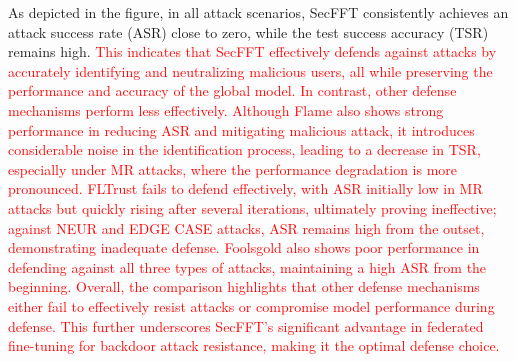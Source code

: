 \documentclass[lettersize,journal]{IEEEtran}
\begin{document}
As depicted in the figure, in all attack scenarios, SecFFT consistently achieves an attack success rate (ASR) close to zero, while the test success accuracy (TSR) remains high. \textcolor{red}{This indicates that SecFFT effectively defends against attacks by accurately identifying and neutralizing malicious users, all while preserving the performance and accuracy of the global model. In contrast, other defense mechanisms perform less effectively. Although Flame also shows strong performance in reducing ASR and mitigating malicious attack, it introduces considerable noise in the identification process, leading to a decrease in TSR, especially under MR attacks, where the performance degradation is more pronounced. FLTrust fails to defend effectively, with ASR initially low in MR attacks but quickly rising after several iterations, ultimately proving ineffective; against NEUR and EDGE CASE attacks, ASR remains high from the outset, demonstrating inadequate defense. Foolsgold also shows poor performance in defending against all three types of attacks, maintaining a high ASR from the beginning. Overall, the comparison highlights that other defense mechanisms either fail to effectively resist attacks or compromise model performance during defense. This further underscores SecFFT's significant advantage in federated fine-tuning for backdoor attack resistance, making it the optimal defense choice.}
\end{document}
